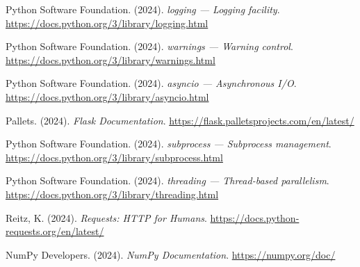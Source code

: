 \begin{thebibliography}{55}
Python Software Foundation. (2024). \emph{logging — Logging facility}. \url{https://docs.python.org/3/library/logging.html}

Python Software Foundation. (2024). \emph{warnings — Warning control}. \url{https://docs.python.org/3/library/warnings.html}

Python Software Foundation. (2024). \emph{asyncio — Asynchronous I/O}. \url{https://docs.python.org/3/library/asyncio.html}

Pallets. (2024). \emph{Flask Documentation}. \url{https://flask.palletsprojects.com/en/latest/}

Python Software Foundation. (2024). \emph{subprocess — Subprocess management}. \url{https://docs.python.org/3/library/subprocess.html}

Python Software Foundation. (2024). \emph{threading — Thread-based parallelism}. \url{https://docs.python.org/3/library/threading.html}

Reitz, K. (2024). \emph{Requests: HTTP for Humans}. \url{https://docs.python-requests.org/en/latest/}

NumPy Developers. (2024). \emph{NumPy Documentation}. \url{https://numpy.org/doc/}

\end{thebibliography}


